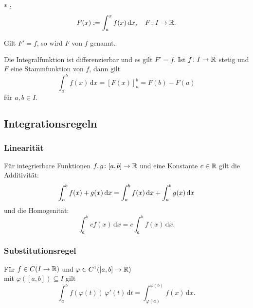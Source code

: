 \begin{definition}[Integralfunktion]\mbox{}\\*
:
\begin{equation}
F(x):=\int_a^x f(x)\,\mathrm dx,\quad F\colon I\to\mathbb R.
\end{equation}
\end{definition}

\begin{definition}[Stammfunktion]\mbox{}\newline
Gilt $F'=f$, so wird $F$  von $f$ genannt.
\end{definition}

\begin{Satz}[Hauptsatz]
Die Integralfunktion ist differenzierbar und es gilt $F'=f$.
Ist $f\colon I\to\mathbb R$ stetig und $F$ eine Stammfunktion von $f$,
dann gilt
\begin{equation}\label{eq:Hauptsatz}
\int_a^b f(x)\,\mathrm dx = [F(x)]_{a}^{b} = F(b)-F(a)
\end{equation}
für $a,b\in I$.
\end{Satz}

\subsection{Integrationsregeln}
\subsubsection{Linearität}
Für integrierbare Funktionen $f,g\colon [a,b]\to\mathbb R$ und eine
Konstante $c\in\mathbb R$ gilt die Additivität:
\begin{equation}
\int_a^b f(x)+g(x)\,\mathrm dx
= \int_a^b f(x)\,\mathrm dx+\int_a^b g(x)\,\mathrm dx\\
\end{equation}
und die Homogenität:
\begin{equation}
\int_a^b c f(x)\,\mathrm dx
= c\int_a^b f(x)\,\mathrm dx.
\end{equation}

\subsubsection{Substitutionsregel}
Für $f\in C(I\to\mathbb R)$ und
$\varphi\in C^1([a,b]\to\mathbb R)$\\
mit $\varphi([a,b])\subseteq I$ gilt%
\begin{equation}
\int_a^b f(\varphi(t))\,\varphi'(t)\,\mathrm dt
= \int_{\varphi(a)}^{\varphi(b)} f(x)\,\mathrm dx.
\end{equation}
